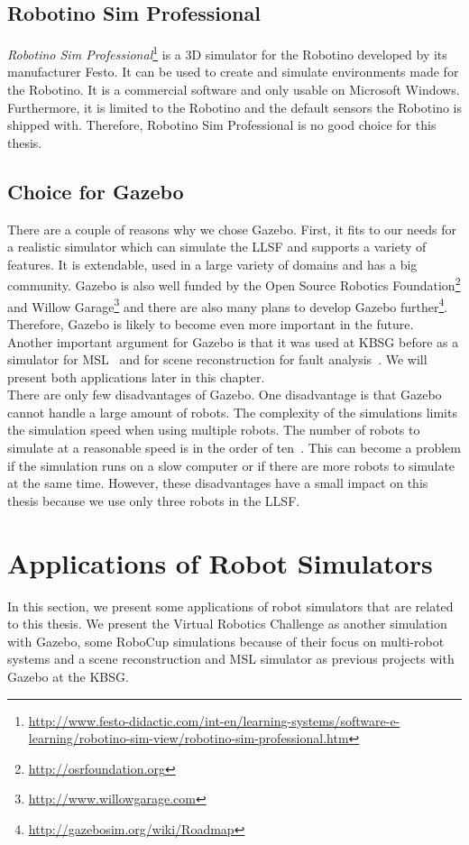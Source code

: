 \subsection{Robotino Sim Professional}
\textit{Robotino Sim Professional}\footnote{\url{http://www.festo-didactic.com/int-en/learning-systems/software-e-learning/robotino-sim-view/robotino-sim-professional.htm}} is a 3D simulator for the Robotino developed by its manufacturer Festo. It can be used to create and simulate environments made for the Robotino. It is a commercial software and only usable on Microsoft Windows. Furthermore, it is limited to the Robotino and the default sensors the Robotino is shipped with. Therefore, Robotino Sim Professional is no good choice for this thesis.

\subsection{Choice for Gazebo}
There are a couple of reasons why we chose Gazebo. First, it fits to our needs for a realistic simulator which can simulate the LLSF and supports a variety of features. It is extendable, used in a large variety of domains and has a big community. Gazebo is also well funded by the Open Source Robotics Foundation\footnote{\url{http://osrfoundation.org}} and Willow Garage\footnote{\url{http://www.willowgarage.com}} and there are also many plans to develop Gazebo further\footnote{\url{http://gazebosim.org/wiki/Roadmap}}. Therefore, Gazebo is likely to become even more important in the future.\\
Another important argument for Gazebo is that it was used at KBSG before as a simulator for MSL~\cite{MultiLevelAbstraction} and for scene reconstruction for fault analysis~\cite{KlingenDA}. We will present both applications later in this chapter.\\
There are only few disadvantages of Gazebo. One disadvantage is that Gazebo cannot handle a large amount of robots. The complexity of the simulations limits the simulation speed when using multiple robots. The number of robots to simulate at a reasonable speed is in the order of ten~\cite{GazeboDesign}. This can become a problem if the simulation runs on a slow computer or if there are more robots to simulate at the same time. However, these disadvantages have a small impact on this thesis because we use only three robots in the LLSF.

\section{Applications of Robot Simulators}
\label{sec:simulations}
In this section, we present some applications of robot simulators that are related to this thesis. We present the Virtual Robotics Challenge as another simulation with Gazebo, some RoboCup simulations because of their focus on multi-robot systems and a scene reconstruction and MSL simulator as previous projects with Gazebo at the KBSG.

